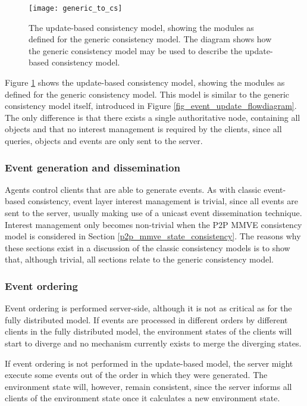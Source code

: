 \begin{figure}[htbp]
 \centering
 \texttt{[image: generic\_to\_cs]}
 \caption{The update-based consistency model, showing the modules as defined for the generic consistency model. The diagram shows how the generic consistency model may be used to describe the update-based consistency model.}
 \label{fig_generic_to_cs}
\end{figure}
%
Figure \ref{fig_generic_to_cs} shows the update-based consistency model, showing the modules as defined for the generic consistency model. This model is similar to the generic consistency model itself, introduced in Figure \ref{fig_event_update_flowdiagram}. The only difference is that there exists a single authoritative node, containing all objects and that no interest management is required by the clients, since all queries, objects and events are only sent to the server.

\subsubsection{Event generation and dissemination}
Agents control clients that are able to generate events. As with classic event-based consistency, event layer interest management is trivial, since all events are sent to the server, usually making use of a unicast event dissemination technique. Interest management only becomes non-trivial when the P2P MMVE consistency model is considered in Section \ref{p2p_mmve_state_consistency}. The reasons why these sections exist in a discussion of the classic consistency models is to show that, although trivial, all sections relate to the generic consistency model.

\subsubsection{Event ordering}
\label{cs_event_ordering}

Event ordering is performed server-side, although it is not as critical as for the fully distributed model. If events are processed in different orders by different clients in the fully distributed model, the environment states of the clients will start to diverge and no mechanism currently exists to merge the diverging states.

If event ordering is not performed in the update-based model, the server might execute some events out of the order in which they were generated. The environment state will, however, remain consistent, since the server informs all clients of the environment state once it calculates a new environment state.

